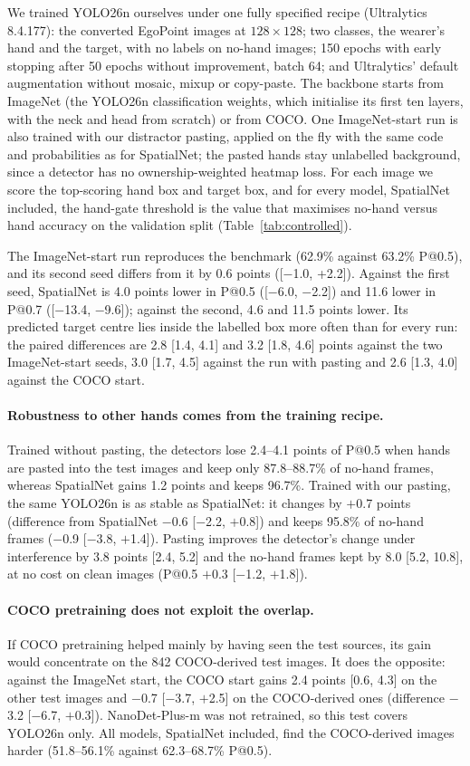 We trained YOLO26n ourselves under one fully specified recipe (Ultralytics 8.4.177): the converted EgoPoint images at $128\times128$; two classes, the wearer's hand and the target, with no labels on no-hand images; 150 epochs with early stopping after 50 epochs without improvement, batch 64; and Ultralytics' default augmentation without mosaic, mixup or copy-paste. The backbone starts from ImageNet (the YOLO26n classification weights, which initialise its first ten layers, with the neck and head from scratch) or from COCO. One ImageNet-start run is also trained with our distractor pasting, applied on the fly with the same code and probabilities as for SpatialNet; the pasted hands stay unlabelled background, since a detector has no ownership-weighted heatmap loss. For each image we score the top-scoring hand box and target box, and for every model, SpatialNet included, the hand-gate threshold is the value that maximises no-hand versus hand accuracy on the validation split (Table~\ref{tab:controlled}).

The ImageNet-start run reproduces the benchmark (62.9\% against 63.2\% P@0.5), and its second seed differs from it by 0.6 points ([$-$1.0, +2.2]). Against the first seed, SpatialNet is 4.0 points lower in P@0.5 ([$-$6.0, $-$2.2]) and 11.6 lower in P@0.7 ([$-$13.4, $-$9.6]); against the second, 4.6 and 11.5 points lower. Its predicted target centre lies inside the labelled box more often than for every run: the paired differences are 2.8 [1.4, 4.1] and 3.2 [1.8, 4.6] points against the two ImageNet-start seeds, 3.0 [1.7, 4.5] against the run with pasting and 2.6 [1.3, 4.0] against the COCO start.

\paragraph{Robustness to other hands comes from the training recipe.} Trained without pasting, the detectors lose 2.4--4.1 points of P@0.5 when hands are pasted into the test images and keep only 87.8--88.7\% of no-hand frames, whereas SpatialNet gains 1.2 points and keeps 96.7\%. Trained with our pasting, the same YOLO26n is as stable as SpatialNet: it changes by $+$0.7 points (difference from SpatialNet $-$0.6 [$-$2.2, $+$0.8]) and keeps 95.8\% of no-hand frames ($-$0.9 [$-$3.8, $+$1.4]). Pasting improves the detector's change under interference by 3.8 points [2.4, 5.2] and the no-hand frames kept by 8.0 [5.2, 10.8], at no cost on clean images (P@0.5 $+$0.3 [$-$1.2, $+$1.8]).

\paragraph{COCO pretraining does not exploit the overlap.}\label{app:coco} If COCO pretraining helped mainly by having seen the test sources, its gain would concentrate on the 842 COCO-derived test images. It does the opposite: against the ImageNet start, the COCO start gains 2.4 points [0.6, 4.3] on the other test images and $-$0.7 [$-$3.7, $+$2.5] on the COCO-derived ones (difference $-$3.2 [$-$6.7, $+$0.3]). NanoDet-Plus-m was not retrained, so this test covers YOLO26n only. All models, SpatialNet included, find the COCO-derived images harder (51.8--56.1\% against 62.3--68.7\% P@0.5).

